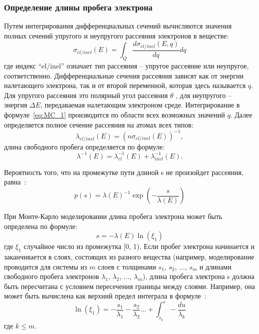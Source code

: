 \subsubsection{Определение длины пробега электрона}
Путем интегрирования дифференциальных сечений вычисляются значения полных сечений упругого и неупругого рассеяния электронов в веществе:
\begin{equation} \label{eq:MC_1}
	\sigma_{el/inel}(E) = \int_Q \frac{d \sigma_{el/inel}(E, q)}{dq} dq
\end{equation}
где индекс ``el/inel'' означает тип рассеяния -- упругое рассеяние или неупругое, соответственно. Дифференциальные сечения рассеяния зависят как от энергии налетающего электрона, так и от второй переменной, которая здесь называется $q$. Для упругого рассеяния это полярный угол рассеяния $\theta$ , для неупругого -- энергия $\Delta E$, передаваемая налетающим электроном среде. Интегрирование в формуле~\ref{eq:MC_1} производится по области всех возможных значений $q$. Далее определяется полное сечение рассеяния на атомах всех типов:
\begin{equation} \label{eq:MC_3}
	\lambda_{el/inel}(E)=\left(n \sigma_{el/inel}(E)\right)^{-1},
\end{equation}
длина свободного пробега определяется по формуле:
\begin{equation} \label{eq:MC_4}
	\lambda^{-1}(E) = \lambda_{el}^{-1}(E)+\lambda_{inel}^{-1}(E).
\end{equation}

Вероятность того, что на промежутке пути длиной s не произойдет рассеяния, равна~\cite{ME_rev_49}:
\begin{equation} \label{eq:MC_5}
	p(s) = \lambda(E)^{-1} \exp \left(-\frac{s}{\lambda(E)}\right)
\end{equation}

При Монте-Карло моделировании длина пробега электрона может быть определена по формуле:
\begin{equation} \label{eq:MC_6}
	s = -\lambda(E) \ln \left(\xi_1\right)
\end{equation}
где $\xi_1$ случайное число из промежутка [0, 1). Если пробег электрона начинается и заканчивается в слоях, состоящих из разного вещества (например, моделирование проводится для системы из $m$ слоев с толщинами $s_1$, $s_2$, ..., $s_m$ и длинами свободного пробега электронов $\lambda_1$, $\lambda_2$, ..., $\lambda_m$), длина пробега электрона s должна быть пересчитана с условием пересечения границы между слоями. Например, она может быть вычислена как верхний предел интеграла в формуле~\cite{Han_2002}:
\begin{equation} \label{eq:MC_7}
	\ln \left(\xi_1\right)=-\frac{s_1}{\lambda_1}-\frac{s_2}{\lambda_2} \ldots+\int_{s_k}^s-\frac{d u}{\lambda_k}
\end{equation}
где $k \leq m$.

